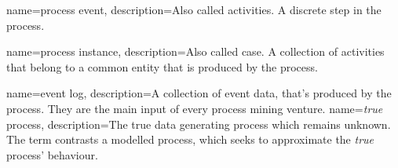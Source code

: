 {
}


{
        name=process event,
        description={Also called activities. A discrete step in the process.}
}

{
        name=process instance,
        description={Also called case. A collection of activities that belong to a common entity that is produced by the process.}
}

{
        name=event log,
        description={A collection of event data, that's produced by the process. They are the main input of every process mining venture.}
}
{
        name=\emph{true} process,
        description={The true data generating process which remains unknown. The term contrasts a modelled process, which seeks to approximate the \emph{true} process' behaviour.}
}


